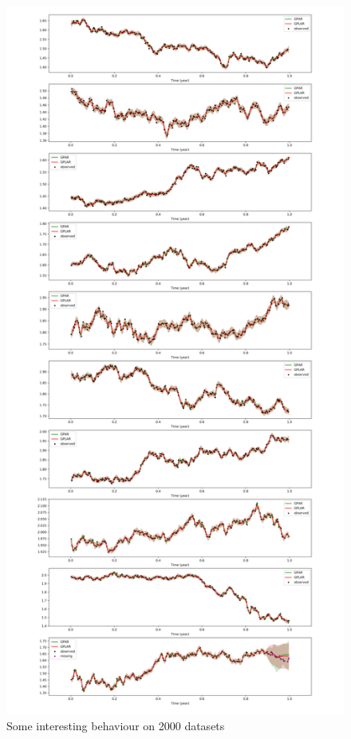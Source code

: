 \documentclass{article}
\begin{document}
\begin{figure}[H]
\centering
\includegraphics[width=.6\linewidth]{USDGBP-21stcentery.png}
\caption{Some interesting behaviour on 2000 datasets}
\end{figure}
\end{document}
